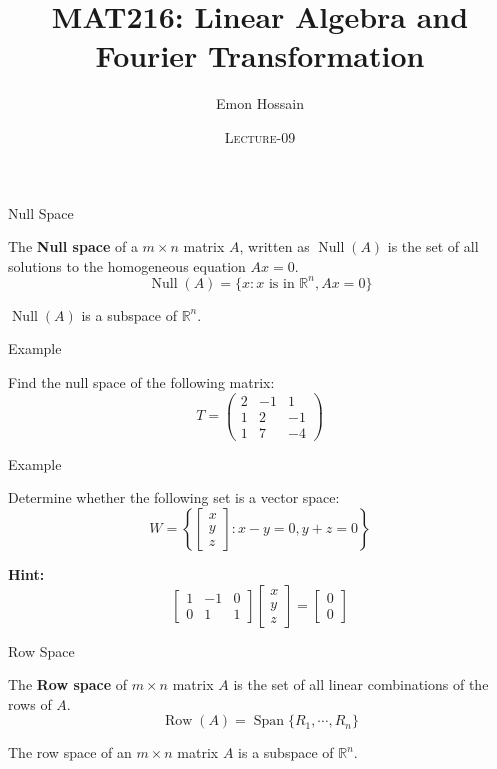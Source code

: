 \documentclass[11pt]{beamer}
\author[] %
{Emon Hossain\inst{1}}
\institute[University of Dhaka] %
{
  \inst{1}%
  Lecturer\\MNS department\\Brac University
}
\date[] %
{\textsc{Lecture-09}}
\title[]{MAT216: Linear Algebra and Fourier Transformation}
\theoremstyle{plain}
\begin{document}
\begin{frame}
\titlepage
\end{frame}

\begin{frame}{Null Space}
    \begin{definition}
        The \textbf{Null space} of a $m\times n$ matrix $A$, written as $\operatorname{Null}(A)$ is the set of all solutions to the homogeneous equation $Ax=0$. 
        $$\operatorname{Null}(A)=\{x:x\text{ is in }\mathbb R^n,Ax=0\}$$
    \end{definition}
    $\operatorname{Null}(A)$ is a subspace of $\mathbb R^n$. 
\end{frame}

\begin{frame}{Example}
    \begin{example}
        Find the null space of the following matrix:
    $$
    T=\begin{pmatrix}
        2&-1&1\\1&2&-1\\1&7&-4
    \end{pmatrix}
    $$
    \end{example}
\end{frame}


\begin{frame}{Example}
    \begin{example}
        Determine whether the following set is a vector space:
    $$
    W=\left\{
    \begin{bmatrix}
        x\\y\\z
    \end{bmatrix}:x-y=0,y+z=0
    \right\}
    $$
    \end{example}
    \textbf{Hint:} 
    $$
    \begin{bmatrix}
        1&-1&0\\0&1&1
    \end{bmatrix}\begin{bmatrix}
        x\\y\\z
    \end{bmatrix}=\begin{bmatrix}
        0\\0
    \end{bmatrix}
    $$
\end{frame}

\begin{frame}{Row Space}
    \begin{definition}
        The \textbf{Row space} of $m\times n$ matrix $A$ is the set of all linear combinations of the rows of $A$. 
        $$\operatorname{Row}(A)=\operatorname{Span}\{R_1,\cdots, R_n\}$$
    \end{definition}
    The row space of an $m\times n$ matrix $A$ is a subspace of $\mathbb R^n$.    
\end{frame}
\end{document}
